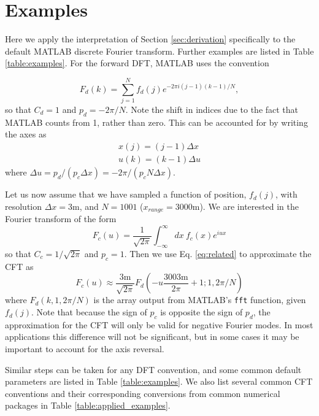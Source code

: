 \documentclass{article}
\begin{document}
\section{Examples}\label{sec:examples}

Here we apply the interpretation of Section \ref{sec:derivation} specifically to the default MATLAB discrete Fourier transform.  Further examples are listed in Table \ref{table:examples}.  For the forward DFT, MATLAB uses the convention

\begin{equation}
F_d(k) = \sum\limits_{j=1}^N f_d(j)e^{-2 \pi i (j-1)(k-1)/N}, \nonumber
\end{equation}
so that $C_d=1$ and $p_d = -2 \pi / N$.  Note the shift in indices due to the fact that MATLAB counts from 1, rather than zero.  This can be accounted for by writing the axes as
\begin{eqnarray}
x(j) = (j-1)\Delta x \nonumber \\
u(k) = (k-1)\Delta u \nonumber
\end{eqnarray}
where $\Delta u = p_d/(p_c \Delta x) = -2 \pi / (p_c N \Delta x)$.

Let us now assume that we have sampled a function of position, $f_d(j)$, with resolution $\Delta x = 3$m, and $N = 1001$ ($x_{range} = 3000$m).  We are interested in the Fourier transform of the form
\begin{equation}
F_c(u) = \frac{1}{\sqrt{2 \pi}}\int_{-\infty}^{\infty} dx \ f_c(x) e^{i u x} \nonumber
\end{equation}
so that $C_c=1/\sqrt{2\pi}$ and $p_c=1$.  Then we use Eq. \ref{eq:related} to approximate the CFT as
\begin{equation}
F_c(u) \approx \frac{3\mbox{m}}{\sqrt{2\pi}} F_d(-u \frac{3003\mbox{m}}{2\pi}+1;1,2\pi/N) \nonumber
\end{equation}
where $F_d(k,1,2\pi/N)$ is the array output from MATLAB's \texttt{fft} function, given $f_d(j)$.  Note that because the sign of $p_c$ is opposite the sign of $p_d$, the approximation for the CFT will only be valid for negative Fourier modes.  In most applications this difference will not be significant, but in some cases it may be important to account for the axis reversal.

Similar steps can be taken for any DFT convention, and some common default parameters are listed in Table \ref{table:examples}.  We also list several common CFT conventions and their corresponding conversions from common numerical packages in Table \ref{table:applied_examples}.
\end{document}
